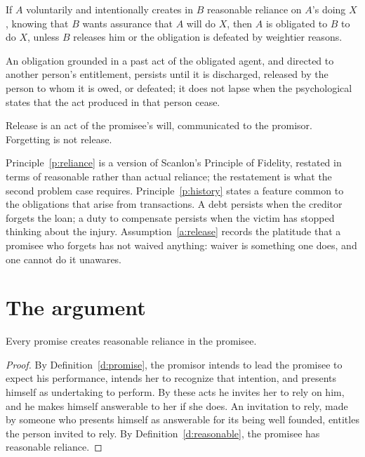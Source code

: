 \documentclass{situationist-preprint}
\begin{document}
\begin{principle}[Reliance]\label{p:reliance}
If $A$ voluntarily and intentionally creates in $B$ reasonable reliance on $A$'s doing $X$, knowing that $B$ wants assurance that $A$ will do $X$, then $A$ is obligated to $B$ to do $X$, unless $B$ releases him or the obligation is defeated by weightier reasons.
\end{principle}

\begin{principle}\label{p:history}
An obligation grounded in a past act of the obligated agent, and directed to another person's entitlement, persists until it is discharged, released by the person to whom it is owed, or defeated; it does not lapse when the psychological states that the act produced in that person cease.
\end{principle}

\begin{assumption}[Release]\label{a:release}
Release is an act of the promisee's will, communicated to the promisor. Forgetting is not release.
\end{assumption}

Principle~\ref{p:reliance} is a version of Scanlon's Principle of Fidelity, restated in terms of reasonable rather than actual reliance; the restatement is what the second problem case requires. Principle~\ref{p:history} states a feature common to the obligations that arise from transactions. A debt persists when the creditor forgets the loan; a duty to compensate persists when the victim has stopped thinking about the injury. Assumption~\ref{a:release} records the platitude that a promisee who forgets has not waived anything: waiver is something one does, and one cannot do it unawares.

\section{The argument}

\begin{lemma}\label{l:creates}
Every promise creates reasonable reliance in the promisee.
\end{lemma}

\begin{proof}
By Definition~\ref{d:promise}, the promisor intends to lead the promisee to expect his performance, intends her to recognize that intention, and presents himself as undertaking to perform. By these acts he invites her to rely on him, and he makes himself answerable to her if she does. An invitation to rely, made by someone who presents himself as answerable for its being well founded, entitles the person invited to rely. By Definition~\ref{d:reasonable}, the promisee has reasonable reliance.
\end{proof}
\end{document}
